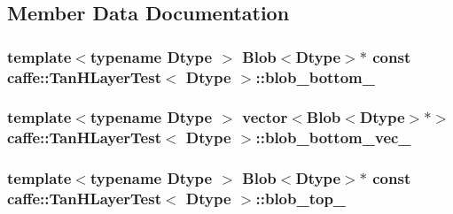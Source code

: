 \subsection{Member Data Documentation}
\hypertarget{classcaffe_1_1_tan_h_layer_test_a4a830828bda12a8faece535af06aca5f}{
\subsubsection[{blob\+\_\+bottom\+\_\+}]{\setlength{\rightskip}{0pt plus 5cm}template$<$typename Dtype $>$ {\bf Blob}$<$Dtype$>$$\ast$ const {\bf caffe\+::\+Tan\+H\+Layer\+Test}$<$ Dtype $>$\+::blob\+\_\+bottom\+\_\+\hspace{0.3cm}{\ttfamily [protected]}}}\label{classcaffe_1_1_tan_h_layer_test_a4a830828bda12a8faece535af06aca5f}
\hypertarget{classcaffe_1_1_tan_h_layer_test_a81638f5f21d8906ff56c4eeeee6cc6d3}{
\subsubsection[{blob\+\_\+bottom\+\_\+vec\+\_\+}]{\setlength{\rightskip}{0pt plus 5cm}template$<$typename Dtype $>$ vector$<${\bf Blob}$<$Dtype$>$$\ast$$>$ {\bf caffe\+::\+Tan\+H\+Layer\+Test}$<$ Dtype $>$\+::blob\+\_\+bottom\+\_\+vec\+\_\+\hspace{0.3cm}{\ttfamily [protected]}}}\label{classcaffe_1_1_tan_h_layer_test_a81638f5f21d8906ff56c4eeeee6cc6d3}
\hypertarget{classcaffe_1_1_tan_h_layer_test_aff624c855eeefd51b2a2f43e3c8625df}{
\subsubsection[{blob\+\_\+top\+\_\+}]{\setlength{\rightskip}{0pt plus 5cm}template$<$typename Dtype $>$ {\bf Blob}$<$Dtype$>$$\ast$ const {\bf caffe\+::\+Tan\+H\+Layer\+Test}$<$ Dtype $>$\+::blob\+\_\+top\+\_\+\hspace{0.3cm}{\ttfamily [protected]}}}\label{classcaffe_1_1_tan_h_layer_test_aff624c855eeefd51b2a2f43e3c8625df}
